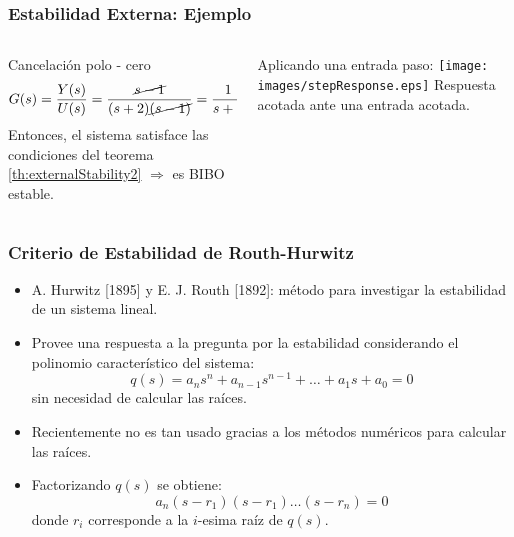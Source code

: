\documentclass[aspectratio=169,handout]{beamer}
\theoremstyle{definition}
\theoremstyle{plain}
\theoremstyle{remark}
\begin{document}
\begin{frame}[<+->][fragile]\frametitle{Estabilidad Externa: Ejemplo}
\vspace*{5mm}
\begin{columns}
\begin{column}{0.5\textwidth}
Cancelación polo - cero
\begin{equation*}
	G(s) = \frac{Y(s)}{U(s)} = \frac{\cancel{s-1}}{(s+2)\cancel{(s-1)}} = \frac{1}{s+2}
\end{equation*}
\pause
Entonces, el sistema satisface las condiciones del teorema \ref{th:externalStability2} $\Rightarrow$ es BIBO estable.
\end{column}	
\begin{column}{0.5\textwidth}
Aplicando una entrada paso:
\centering
\texttt{[image: images/stepResponse.eps]}
Respuesta acotada ante una entrada acotada.
\end{column}	
\end{columns}
\end{frame}

\begin{frame}[<+->]\frametitle{Criterio de Estabilidad de Routh-Hurwitz}
\begin{itemize}
	\item A. Hurwitz [1895] y E. J. Routh [1892]: método para investigar la estabilidad de un sistema lineal.
	\item Provee una respuesta a la pregunta por la estabilidad considerando el polinomio característico del sistema:
	\begin{equation*}
		q(s) = a_n s^n + a_{n-1} s^{n-1} + \dots + a_1 s + a_0 = 0
	\end{equation*}
	sin necesidad de calcular las raíces.
	\item Recientemente no es tan usado gracias a los métodos numéricos para calcular las raíces.
	\item Factorizando $q(s)$ se obtiene:
	\begin{equation*}
		a_n (s-r_1) (s-r_1) \dots (s-r_n) = 0
	\end{equation*}
	donde $r_i$ corresponde a la $i$-esima raíz de $q(s)$.
\end{itemize}
\end{frame}
\end{document}
